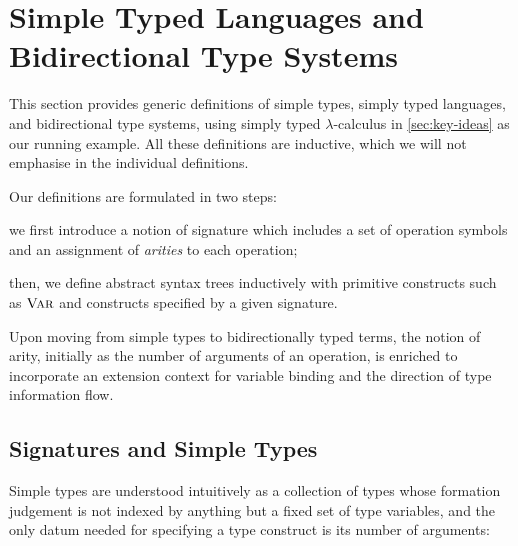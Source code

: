 
\section{Simple Typed Languages and Bidirectional Type Systems}\label{sec:defs}
This section provides generic definitions
of simple types, simply typed languages, and bidirectional type systems, using simply typed $\lambda$-calculus in \cref{sec:key-ideas} as our running example.
All these definitions are inductive, which we will not emphasise in the individual definitions.

Our definitions are formulated in two steps:
\begin{enumerate*}
  \item we first introduce a notion of signature which includes a set of operation symbols and an assignment of \emph{arities} to each operation;
\item then, we define abstract syntax trees inductively with primitive constructs such as $\textnormal{\textsc{Var}}$ and constructs specified by a given signature.
\end{enumerate*}
Upon moving from simple types to bidirectionally typed terms, the notion of arity, initially as the number of arguments of an operation, is enriched to incorporate an extension context for variable binding and the direction of type information flow.

\subsection{Signatures and Simple Types} \label{subsec:simple-types}
Simple types are understood intuitively as a collection of types whose formation judgement is not indexed by anything but a fixed set of type variables, and the only datum needed for specifying a type construct is its number of arguments:

